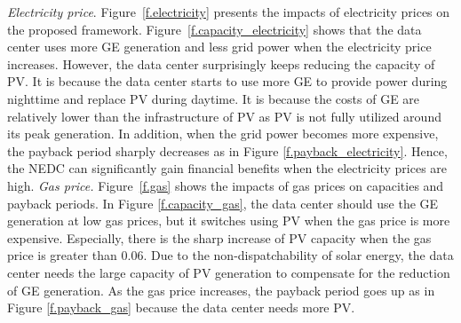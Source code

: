 \emph{Electricity price}. Figure~\ref{f.electricity} presents the impacts of electricity prices on the proposed framework. Figure~\ref{f.capacity_electricity} shows that the data center uses more GE generation and less grid power when the electricity price increases. However, the data center surprisingly keeps reducing the capacity of PV. It is because the data center starts to use more GE to provide power during nighttime and replace PV during daytime. It is because the costs of GE are relatively lower than the infrastructure of PV as PV is not fully utilized around its peak generation. In addition, when the grid power becomes more expensive, the payback period sharply decreases as in Figure \ref{f.payback_electricity}. Hence, the NEDC can significantly gain financial benefits when the electricity prices are high.
\emph{Gas price.} Figure~\ref{f.gas} shows the impacts of gas prices on capacities and payback periods. In Figure \ref{f.capacity_gas}, the data center should use the GE generation at low gas prices, but it switches using PV when the gas price is more expensive. Especially, there is the sharp increase of PV capacity when the gas price is greater than $0.06$. Due to the non-dispatchability of solar energy, the data center needs the large capacity of PV generation to compensate for the reduction of GE generation. As the gas price increases, the payback period goes up as in Figure \ref{f.payback_gas} because the data center needs more PV.

